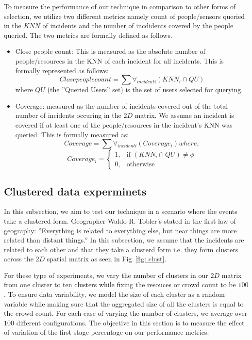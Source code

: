 \documentclass{acm_proc_article-sp}
\begin{document}
 To measure the performance of our technique in comparison to other forms of selection, we utilize two different metrics namely count of people/sensors queried in the $KNN$ of incidents and the number of incdidents covered by the people queried. The two metrics are formally defined as follows.
 \begin{itemize}
 \item Close people count: This is measured as the absolute number of people/resources in the KNN of each incident for all incidents. This is formally represented as follows:
 \begin{equation}
 Close people count = \sum \forall_{incident i} (KNN_i \cap {QU})
 \end{equation}
 where $QU$ (the ''Queried Users'' set) is the set of users selected for querying. 
 \item Coverage: measured as the number of incidents covered out of the total number of incidents occuring in the $2D$ matrix. We assume an incident is covered if at least one of the people/resources in the incident's KNN was queried. This is formally measured as:
 \begin{equation}
Coverage = \sum \forall_{incident i} (Coverage_i) where,
 \end{equation}
 \[
    Coverage_i = 
\begin{cases}
    1,& \text{if }(KNN_i \cap {QU}) \neq \phi\\
    0,              & \text{otherwise}
\end{cases}
\]
\end{itemize}  

\subsection{Clustered data experminets}
In this subsection, we aim to test our technique in a scenario where the events take a clustered form. Geographer Waldo R. Tobler's stated in the first law of geography: ''Everything is related to everything else, but near things are more related than distant things.'' In this subsection, we assume that the incidents are related to each other and that they take a clusterd form i.e. they form clusters across the $2D$ spatial matrix as seen in Fig~\ref{fig: clust}. \par
For these type of experiments, we vary the number of clusters in our $2D$ matrix from one cluster to ten clusters while fixing the resouces or crowd count to be $100$. To ensure data variability, we model the size of each cluster as a random variable while making sure that the aggregated size of all the clusters is equal to the crowd count. For each case of varying the number of clusters, we average over $100$ different configurations. The objective in this section is to measure the effect of variation of the first stage percentage on our performance metrics.
   
\end{document}
